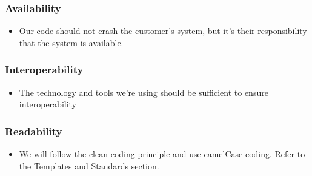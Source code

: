 \subsubsection{Availability}
\begin{itemize}
\item Our code should not crash the customer's system, but it's their responsibility that the system is available.
\end{itemize}

\subsubsection{Interoperability}
\begin{itemize}
\item The technology and tools we're using should be sufficient to ensure interoperability
\end{itemize}

\subsubsection{Readability}
\begin{itemize}
\item We will follow the clean coding principle and use camelCase coding. Refer to the Templates and Standards section.
\end{itemize}